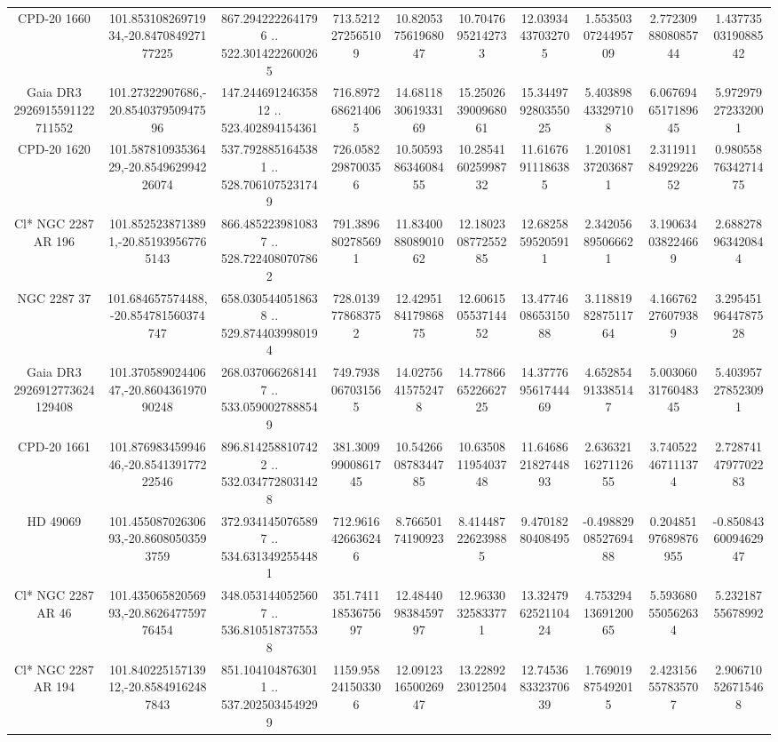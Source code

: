 \begin{table}
\begin{tabular}{cccccccccc}
CPD-20  1660 & 101.85310826971934,-20.847084927177225 & 867.2942222641796 .. 522.3014222600265 & 713.5212272565109 & 10.820537561968047 & 10.70476952142733 & 12.03934437032705 & 1.5535030724495709 & 2.7723098808085744 & 1.4377350319088542 \\
Gaia DR3 2926915591122711552 & 101.27322907686,-20.854037950947596 & 147.24469124635812 .. 523.402894154361 & 716.8972686214065 & 14.681183061933169 & 15.250263900968061 & 15.344979280355025 & 5.403898433297108 & 6.0676946517189645 & 5.972979272332001 \\
CPD-20  1620 & 101.58781093536429,-20.854962994226074 & 537.7928851645381 .. 528.7061075231749 & 726.0582298700356 & 10.505938634608455 & 10.285416025998732 & 11.61676911186385 & 1.201081372036871 & 2.3119118492922652 & 0.9805587634271475 \\
Cl* NGC 2287     AR     196 & 101.8525238713891,-20.851939567765143 & 866.4852239810837 .. 528.7224080707862 & 791.3896802785691 & 11.834008808901062 & 12.180230877255285 & 12.68258595205911 & 2.342056895066621 & 3.190634038224669 & 2.688278963420844 \\
NGC  2287    37 & 101.684657574488,-20.854781560374747 & 658.0305440518638 .. 529.8744039980194 & 728.0139778683752 & 12.429518417986875 & 12.606150553714452 & 13.477460865315088 & 3.1188198287511764 & 4.166762276079389 & 3.2954519644787528 \\
Gaia DR3 2926912773624129408 & 101.37058902440647,-20.860436197090248 & 268.0370662681417 .. 533.0590027888549 & 749.7938067031565 & 14.02756415752478 & 14.778666522662725 & 14.377769561744469 & 4.652854913385147 & 5.0030603176048345 & 5.403957278523091 \\
CPD-20  1661 & 101.87698345994646,-20.854139177222546 & 896.8142588107422 .. 532.0347728031428 & 381.30099900861745 & 10.542660878344785 & 10.635081195403748 & 11.646862182744893 & 2.6363211627112655 & 3.740522467111374 & 2.7287414797702283 \\
HD  49069 & 101.45508702630693,-20.86080503593759 & 372.9341450765897 .. 534.6313492554481 & 712.9616426636246 & 8.76650174190923 & 8.414487226239885 & 9.47018280408495 & -0.4988290852769488 & 0.20485197689876955 & -0.8508436009462947 \\
Cl* NGC 2287     AR      46 & 101.43506582056993,-20.862647759776454 & 348.0531440525607 .. 536.8105187375538 & 351.74111853675697 & 12.484409838459797 & 12.96330325833771 & 13.324796252110424 & 4.7532941369120065 & 5.593680550562634 & 5.23218755678992 \\
Cl* NGC 2287     AR     194 & 101.84022515713912,-20.85849162487843 & 851.1041048763011 .. 537.2025034549299 & 1159.958241503306 & 12.091231650026947 & 13.2289223012504 & 12.745368332370639 & 1.769019875492015 & 2.423156557835707 & 2.906710526715468 \\

\end{tabular}
\end{table}
